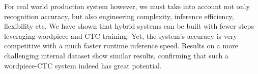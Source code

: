 \documentclass[a4paper]{article}
\begin{document}
For real world production system however, we must take into account not only recognition accuracy, but also engineering complexity, inference efficiency, flexibility etc. We have shown that hybrid systems can be built with fewer steps leveraging wordpiece and CTC training. Yet, the system's accuracy is very competitive with a much faster runtime inference speed. Results on a more challenging internal dataset show similar results, confirming that such a wordpiece-CTC system indeed has great potential.

\footnotesize


\end{document}
